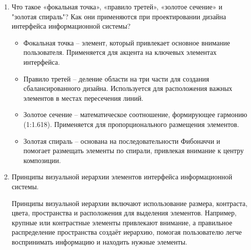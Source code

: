 \begin{enumerate}
\item Что такое «фокальная точка», «правило третей», «золотое сечение» и "золотая спираль"? Как они применяются при проектировании дизайна интерфейса информационной системы?
    \begin{itemize}
        \item Фокальная точка – элемент, который привлекает основное внимание пользователя. Применяется для акцента на ключевых элементах интерфейса.
        \item Правило третей – деление области на три части для создания сбалансированного дизайна. Используется для расположения важных элементов в местах пересечения линий.
        \item Золотое сечение – математическое соотношение, формирующее гармонию (1:1.618). Применяется для пропорционального размещения элементов.
        \item Золотая спираль – основана на последовательности Фибоначчи и помогает размещать элементы по спирали, привлекая внимание к центру композиции.
    \end{itemize}

\item Принципы визуальной иерархии элементов интерфейса информационной системы.

    Принципы визуальной иерархии включают использование размера, контраста, цвета, пространства и расположения для выделения элементов. Например, крупные или контрастные элементы привлекают внимание, а правильное распределение пространства создаёт иерархию, помогая пользователю легче воспринимать информацию и находить нужные элементы.
\end{enumerate}


